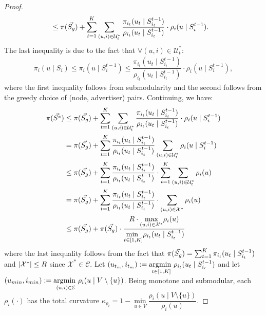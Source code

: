 \begin{proof}
\begin{align*}
&\le \pi(\vec{S_g})  + \sum_{t=1}^{K} \sum_{(u,i) \in \mathcal{U}^*_t} \dfrac{\pi_{i_t}(u_t \mid S_{i_t}^{t-1})}{\rho_{i_t}(u_t \mid S_{i_t}^{t-1})} \cdot \rho_i(u \mid S_i^{t-1}).
\end{align*}
The last inequality is due to the fact that
$\forall (u,i) \in \mathcal{U}^*_t$:
\begin{align*}
\pi_i(u \mid S_i) \le \pi_i(u \mid S_{i}^{t-1}) \le \dfrac{\pi_{i_t}(u_t \mid S_{i_t}^{t-1})}{\rho_{i_t}(u_t \mid S_{i_t}^{t-1})} \cdot \rho_{i}(u \mid S_{i}^{t-1}),
\end{align*}
where the first inequality follows from submodularity and the second follows from the greedy choice of (node, advertiser) pairs.
%
Continuing, we have:
 \begin{align}
 \label{eq:toBeContd}
\pi(\vec{S^*}) &\le \pi(\vec{S_g})  + \sum_{t=1}^{K} \sum_{(u,i) \in \mathcal{U}^*_t} \dfrac{\pi_{i_t}(u_t \mid S_{i_t}^{t-1})}{\rho_{i_t}(u_t \mid S_{i_t}^{t-1})} \cdot \rho_i(u \mid S_i^{t-1}) \nonumber \\
&= \pi(\vec{S_g})  + \sum_{t=1}^{K} \dfrac{\pi_{i_t}(u_t \mid S_{i_t}^{t-1})}{\rho_{i_t}(u_t \mid S_{i_t}^{t-1})} \sum_{(u,i) \in \mathcal{U}^*_t} \rho_i(u \mid S_i^{t-1})  \nonumber  \\
&\le \pi(\vec{S_g})  + \sum_{t=1}^{K} \dfrac{\pi_{i_t}(u_t \mid S_{i_t}^{t-1})}{\rho_{i_t}(u_t \mid S_{i_t}^{t-1})} \cdot \sum_{t=1}^{K} \sum_{(u,i) \in \mathcal{U}^*_t} \rho_i(u) \nonumber \\
&= \pi(\vec{S_g})  + \sum_{t=1}^{K} \dfrac{\pi_{i_t}(u_t \mid S_{i_t}^{t-1})}{\rho_{i_t}(u_t \mid S_{i_t}^{t-1})} \cdot  \sum_{(u,i) \in \mathcal{X}^*} \rho_i(u) \nonumber \\
&\le \pi(\vec{S_g})  + \pi(\vec{S_g}) \cdot \dfrac{R \cdot \underset{(u,i) \in \mathcal{X}^*} {\max} \rho_i(u)  }{\underset{t \in [1,K]} {\text{min }} \rho_{i_t}(u_t \mid S_{i_t}^{t-1})}
\end{align}
where the last inequality follows from the fact that $\pi(\vec{S_g}) = \sum_{t=1}^{K} \pi_{i_t}(u_t \mid S_{i_t}^{t-1})$ and $\left\vert{\mathcal{X}^*}\right\vert \le R$ since $\mathcal{X}^* \in \mathcal{C}$. Let $(u_{t_m}, i_{t_m}) := \underset{t \in [1,K]} {\operatorname*{\arg\!\min~}} \rho_{i_t}(u_t \mid S_{i_t}^{t-1})$ and let $(u_{min}, i_{min}) := \underset{(u,i) \in \mathcal{E}} {\operatorname*{\arg\!\min~}} \rho_i(u \mid V \setminus \{u\}) $. Being monotone and submodular, each $\rho_i(\cdot)$ has the total curvature $\kappa_{\rho_i} = 1 - \underset{u \in V} {\min} \dfrac{\rho_i(u \mid V\setminus \{u\})}{\rho_i(u)}$.

\end{proof}
